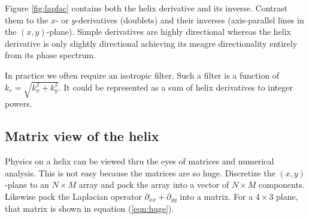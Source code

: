 
\par
Figure \ref{fig:lapfac} contains both the helix derivative and its inverse.
Contrast them to the $x$- or $y$-derivatives (doublets) and their inverses
(axis-parallel lines in the $(x,y)$-plane).
Simple derivatives are highly directional
whereas the helix derivative is only slightly directional
achieving its meagre directionality entirely from its phase spectrum.

\par
In practice we often require an isotropic filter.
Such a filter is a function of $k_r=\sqrt{k_x^2 + k_y^2}$.
It could be represented as a sum of helix derivatives to integer powers.

\subsection{Matrix view of the helix}
Physics on a helix can be viewed thru the eyes
of matrices and numerical analysis.
This is not easy because the matrices are so huge.
Discretize the $(x,y)$-plane to an $N\times M$ array
and pack the array into a vector of $N\times M$ components.
Likewise pack the Laplacian operator $\partial_{xx}+\partial_{yy}$
into a matrix.
For a $4\times 3$ plane, that matrix is shown in equation (\ref{eqn:huge}).


